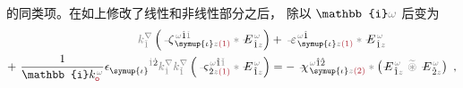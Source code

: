 的同类项。在如上修改了线性和非线性部分之后， 除以 $\mathbb{i} \mathcolor{gray}{\omega}$ 后变为
\begin{subequations}
\begin{align}
	\mathcolor{gray}{k^\nabla_{\check{1}}} \left( \Xint{\begin{smallmatrix} ~ \\ {}^{}_{\mathcolor{gray}{-}} \\ ~ \end{smallmatrix}}{12}{\zeta}^{\;\! \mathcolor{gray}{\omega} \hat{1} \mathcolor{gray}{\check{1}}}_{\;\! \symup{\iota} \mathcolor{gray}{z} \textcolor{Maroon}{(1)}} \mathcolor{gray}{*} \Xint{\mathcolor{gray}{-}}{295}{E}^{\;\!\mathcolor{gray}{\omega}}_{\;\! \hat{1} \mathcolor{gray}{z}} \right) &+ \Xint{\begin{smallmatrix} ~ \\ {}^{}_{\mathcolor{gray}{-}} \\ ~ \end{smallmatrix}}{16}{\varepsilon}^{\;\! \mathcolor{gray}{\omega} \hat{1}}_{\;\! \symup{\iota} \mathcolor{gray}{z} \textcolor{Maroon}{(1)}} \mathcolor{gray}{*} \Xint{\mathcolor{gray}{-}}{295}{E}^{\;\!\mathcolor{gray}{\omega}}_{\;\! \hat{1} \mathcolor{gray}{z}}  \label{eq:nonlinear(2)-wave_wkrho-simplify1} \\ 
	+~ \frac{1}{\mathbb{i} k_{\textcolor{Maroon}{\mathsf{o}}}^{\;\! \mathcolor{gray}{\omega}}} \epsilon^{\hphantom{\symup{\iota}}\mathcolor{gray}{\dot{1}}\dot{2}}_{\symup{\iota}} \mathcolor{gray}{k^\nabla_{\dot{1}}} \mathcolor{gray}{k^\nabla_{\check{1}}} \left( \Xint{\begin{smallmatrix} ~ \\ {}^{}_{\mathcolor{gray}{-}} \\ ~ \end{smallmatrix}}{13}{\varsigma}^{\;\! \mathcolor{gray}{\omega} \hat{1} \mathcolor{gray}{\check{1}}}_{\;\! \dot{2} \mathcolor{gray}{z} \textcolor{Maroon}{(1)}} \mathcolor{gray}{*} \Xint{\mathcolor{gray}{-}}{295}{E}^{\;\!\mathcolor{gray}{\omega}}_{\;\! \hat{1} \mathcolor{gray}{z}} \right) &= - ~\Xint{{}^{}_{\mathcolor{gray}{-}}}{23}{\chi}^{\;\! \mathcolor{gray}{\omega} \hat{1} \hat{2}}_{\;\! \symup{\iota} \mathcolor{gray}{z} \textcolor{Maroon}{(2)}} \mathcolor{gray}{*} \left( \Xint{\mathcolor{gray}{-}}{295}{E}^{\;\!\mathcolor{gray}{\omega}}_{\;\! \hat{1} \mathcolor{gray}{z}} ~\mathcolor{gray}{\widetilde \circledast}~ \Xint{\mathcolor{gray}{-}}{295}{E}^{\;\!\mathcolor{gray}{\omega}}_{\;\! \hat{2} \mathcolor{gray}{z}} \right)~, \label{eq:nonlinear(2)-wave_wkrho-simplify1-2}
\end{align}
\end{subequations}
